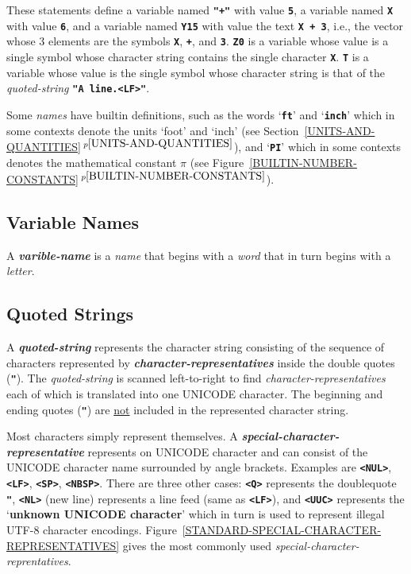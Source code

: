 \documentclass[12pt]{article}
\newcommand{\TT}[1]{{\tt \bfseries #1}}
\newcommand{\key}[1]{{\rm \bfseries #1}}
\newcommand{\emkey}[1]{{\em \bfseries #1}}
\newcommand{\tttkey}[1]{{\tt \bfseries <#1>}}
\newcommand{\itemref}[1]{\ref{#1}$\,^{p\pageref{#1}}$}
\begin{document}
These statements define
a variable named \TT{"+"} with value \TT{5}, a variable
named \TT{X} with value \TT{6}, and
a variable named \TT{Y15} with value the text \TT{X + 3},
i.e., the vector whose 3 elements are the symbols
\TT{X}, \TT{+}, and \TT{3}.  \TT{Z0} is a variable whose
value is a single symbol whose character string contains
the single character \TT{X}.
\TT{T} is a variable whose value is the single symbol
whose character string is that of the {\em quoted-string} \TT{"A line.<LF>"}.

Some {\em names} have builtin definitions, such as the
words `\TT{ft}' and `\TT{inch}' which in some contexts denote the
units `foot' and `inch' (see Section~\itemref{UNITS-AND-QUANTITIES}),
and `\TT{PI}' which in some contexts denotes the mathematical
constant $\pi$ (see Figure~\itemref{BUILTIN-NUMBER-CONSTANTS}).



\subsection{Variable Names}
\label{VARIABLE-NAMES}
A \emkey{varible-name} is a {\em name} that begins with a
{\em word} that in turn begins with a {\em letter}.

\subsection{Quoted Strings}
\label{QUOTED-STRINGS}

A \emkey{quoted-string} represents the character string consisting of
the sequence of characters represented by \emkey{charac\-ter-representatives}
inside the double quotes (\TT{"}).
The {\em quoted-string} is scanned
left-to-right to find {\em character-representatives}
each of which is translated into one UNICODE character.
The beginning and ending quotes (\TT{"}) are \underline{not}
included in the represented character string.

Most characters simply represent themselves.
A \emkey{special-character-representative} represents on UNICODE character
and can consist of the UNICODE character name surrounded by angle brackets.
Examples are
\TT{<NUL>}, \TT{<LF>}, \TT{<SP>}, \TT{<NBSP>}.  There are three other cases:
\tttkey{Q} represents the doublequote \TT{"}, \tttkey{NL} (new line)
represents a line feed (same as \TT{<LF>}), and \tttkey{UUC} represents
the `\key{unknown UNICODE character}' which in turn is used to represent
illegal UTF-8 character encodings.
Figure~\ref{STANDARD-SPECIAL-CHARACTER-REPRESENTATIVES}
gives the most commonly used {\em special-character-reprentatives}.
\end{document}
